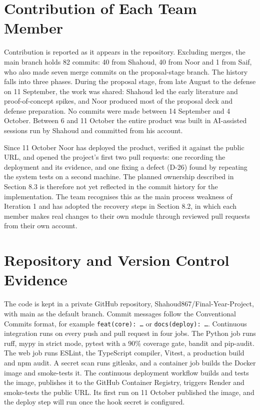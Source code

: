 \section{Contribution of Each Team Member}

Contribution is reported as it appears in the repository. Excluding merges, the main branch holds 82 commits: 40 from Shahoud, 40 from Noor and 1 from Saif, who also made seven merge commits on the proposal-stage branch. The history falls into three phases. During the proposal stage, from late August to the defense on 11 September, the work was shared: Shahoud led the early literature and proof-of-concept spikes, and Noor produced most of the proposal deck and defense preparation. No commits were made between 14 September and 4 October. Between 6 and 11 October the entire product was built in AI-assisted sessions run by Shahoud and committed from his account.

Since 11 October Noor has deployed the product, verified it against the public URL, and opened the project's first two pull requests: one recording the deployment and its evidence, and one fixing a defect (D-26) found by repeating the system tests on a second machine. The planned ownership described in Section 8.3 is therefore not yet reflected in the commit history for the implementation. The team recognises this as the main process weakness of Iteration 1 and has adopted the recovery steps in Section 8.2, in which each member makes real changes to their own module through reviewed pull requests from their own account.

\section{Repository and Version Control Evidence}

The code is kept in a private GitHub repository, Shahoud867/Final-Year-Project, with main as the default branch. Commit messages follow the Conventional Commits format, for example \texttt{feat(\allowbreak{}core): \ldots{}} or \texttt{docs(\allowbreak{}deploy): \ldots{}}. Continuous integration runs on every push and pull request in four jobs. The Python job runs ruff, mypy in strict mode, pytest with a 90\% coverage gate, bandit and pip-audit. The web job runs ESLint, the TypeScript compiler, Vitest, a production build and npm audit. A secret scan runs gitleaks, and a container job builds the Docker image and smoke-tests it. The continuous deployment workflow builds and tests the image, publishes it to the GitHub Container Registry, triggers Render and smoke-tests the public URL. Its first run on 11 October published the image, and the deploy step will run once the hook secret is configured.

